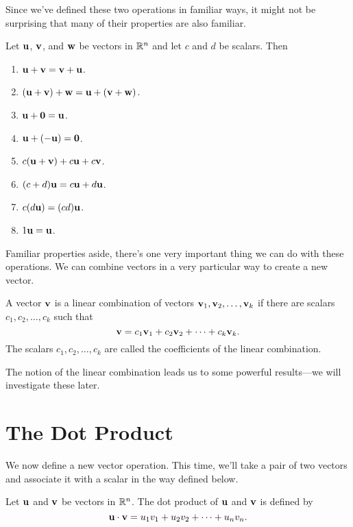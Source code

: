 \documentclass[../m073main.tex]{subfiles}
\begin{document}
Since we've defined these two operations in familiar ways, it might not be surprising that many of their properties are also familiar.

\begin{theorem}
	Let $\mathbf{u}$, $\mathbf{v}$, and $\mathbf{w}$ be vectors in $\mathbb{R}^n$ and let $c$ and $d$ be scalars.
	Then
	\begin{enumerate}[label=(\alph*)]
		\item $\mathbf{u} + \mathbf{v} = \mathbf{v} + \mathbf{u}$.
		\item $(\mathbf{u} + \mathbf{v}) + \mathbf{w} = \mathbf{u} + (\mathbf{v} + \mathbf{w})$.
		\item $\mathbf{u} + \mathbf{0} = \mathbf{u}$.
		\item $\mathbf{u} + (-\mathbf{u}) = \mathbf{0}$.
		\item $c(\mathbf{u} + \mathbf{v}) + c \mathbf{u} + c \mathbf{v}$.
		\item $(c + d) \mathbf{u} = c \mathbf{u} + d \mathbf{u}$.
		\item $c(d \mathbf{u}) = (cd) \mathbf{u}$.
		\item $1 \mathbf{u} = \mathbf{u}$.
	\end{enumerate}
\end{theorem}

Familiar properties aside, there's one very important thing we can do with these operations.
We can combine vectors in a very particular way to create a new vector.

\begin{definition}
	A vector $\mathbf{v}$ is a linear combination of vectors $\mathbf{v}_1, \mathbf{v}_2, \ldots, \mathbf{v}_k$ if there are scalars $c_1, c_2, \ldots, c_k$ such that
	\[ \mathbf{v} = c_1 \mathbf{v}_1 + c_2 \mathbf{v}_2 + \cdots + c_k \mathbf{v}_k. \]
	The scalars $c_1, c_2, \ldots, c_k$ are called the coefficients of the linear combination.
\end{definition}

The notion of the linear combination leads us to some powerful results---we will investigate these later.

\section{The Dot Product}
We now define a new vector operation.
This time, we'll take a pair of two vectors and associate it with a scalar in the way defined below.

\begin{definition}
	Let $\mathbf{u}$ and $\mathbf{v}$ be vectors in $\mathbb{R}^n$.
	The dot product of $\mathbf{u}$ and $\mathbf{v}$ is defined by
	\[ \mathbf{u} \cdot \mathbf{v} = u_1 v_1 + u_2 v_2 + \cdots + u_n v_n. \]
\end{definition}
\end{document}
